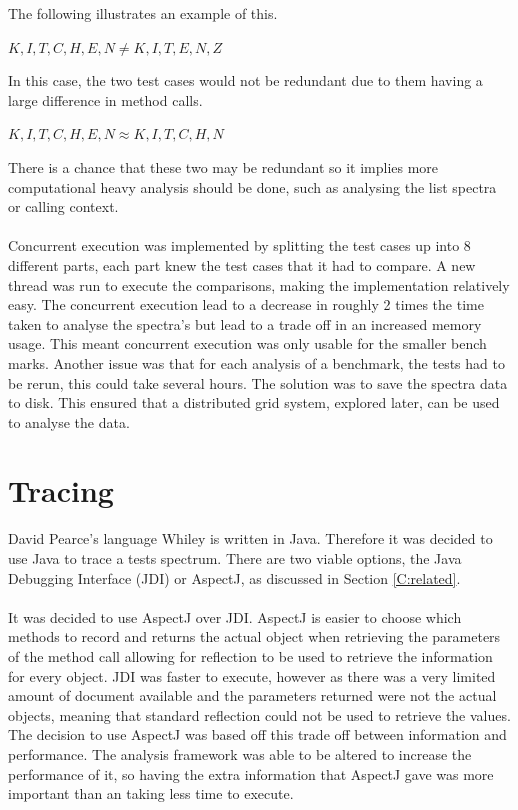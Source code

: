 The following illustrates an example of this.

$K,I,T,C,H,E,N \neq K,I,T,E,N,Z $

In this case, the two test cases would not be redundant due to them having a large difference in method calls.

$K,I,T,C,H,E,N \approx K,I,T,C,H,N$

There is a chance that these two may be redundant so it implies more computational heavy analysis should be done, such as analysing the list spectra or calling context. 
\paragraph{}
Concurrent execution was implemented by splitting the test cases up into 8 different parts, each part knew the test cases that it had to compare. A new thread was run to execute the comparisons, making the implementation relatively easy. The concurrent execution lead to a decrease in roughly 2 times the time taken to analyse the spectra's but lead to a trade off in an increased memory usage. This meant concurrent execution was only usable for the smaller bench marks.
Another issue was that for each analysis of a benchmark, the tests had to be rerun, this could take several hours. The solution was to save the spectra data to disk. This ensured that a distributed grid system, explored later, can be used to analyse the data.

\section{Tracing}
\label{S:trace}
David Pearce's language Whiley is written in Java. Therefore it was decided to use Java to trace a tests spectrum. There are two viable options, the Java Debugging Interface (JDI) or AspectJ, as discussed in Section \ref{C:related}. 
\paragraph{}
It was decided to use AspectJ over JDI. AspectJ is easier to choose which methods to record and returns the actual object when retrieving the parameters of the method call allowing for reflection to be used to retrieve the information for every object. JDI was faster to execute, however as there was a very limited amount of document available and the parameters returned were not the actual objects, meaning that standard reflection could not be used to retrieve the values. The decision to use AspectJ was based off this trade off between information and performance. The analysis framework was able to be altered to increase the performance of it, so having the extra information that AspectJ gave was more important than an taking less time to execute. 
